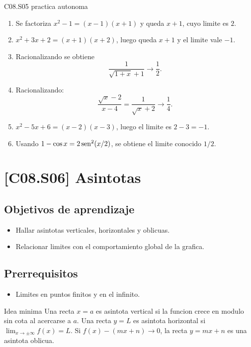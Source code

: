 \begin{fullsolution}{C08.S05 practica autonoma}
\begin{enumerate}[label=\textbf{PX-C08.S05-\arabic*:}, leftmargin=*]
  \item Se factoriza \(x^2-1=(x-1)(x+1)\) y queda \(x+1\), cuyo limite es \(2\).
  \item \(x^2+3x+2=(x+1)(x+2)\), luego queda \(x+1\) y el limite vale \(-1\).
  \item Racionalizando se obtiene
  \[
  \frac{1}{\sqrt{1+x}+1}\to \frac{1}{2}.
  \]
  \item Racionalizando:
  \[
  \frac{\sqrt{x}-2}{x-4}=\frac{1}{\sqrt{x}+2}\to \frac{1}{4}.
  \]
  \item \(x^2-5x+6=(x-2)(x-3)\), luego el limite es \(2-3=-1\).
  \item Usando \(1-\cos x=2\operatorname{sen}^2(x/2)\), se obtiene el limite conocido \(1/2\).
\end{enumerate}
\end{fullsolution}

\section{[C08.S06] Asintotas}

\subsection*{Objetivos de aprendizaje}
\begin{itemize}
  \item Hallar asintotas verticales, horizontales y oblicuas.
  \item Relacionar limites con el comportamiento global de la grafica.
\end{itemize}

\subsection*{Prerrequisitos}
\begin{itemize}
  \item Limites en puntos finitos y en el infinito.
\end{itemize}

\begin{theorybox}{Idea minima}
Una recta \(x=a\) es asintota vertical si la funcion crece en modulo sin cota al acercarse a
\(a\). Una recta \(y=L\) es asintota horizontal si \(\lim_{x\to\pm\infty}f(x)=L\). Si
\(f(x)-(mx+n)\to 0\), la recta \(y=mx+n\) es una asintota oblicua.
\end{theorybox}

